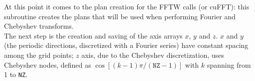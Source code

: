 At this point it comes to the plan creation for the FFTW calls (or cuFFT): this subroutine creates the plans that will be used when performing Fourier and Chebyshev transforms.\\
The next step is the creation and saving of the axis arrays $x$, $y$ and $z$. $x$ and $y$ (the periodic directions, discretized with a Fourier series) have constant spacing among the grid points; $z$ axis, due to the Chebyshev discretization, uses Chebyshev nodes, defined as $\cos{[(k-1)\pi/(\texttt{NZ}-1)]}$ with $k$ spanning from 1 to \texttt{NZ}.\\
